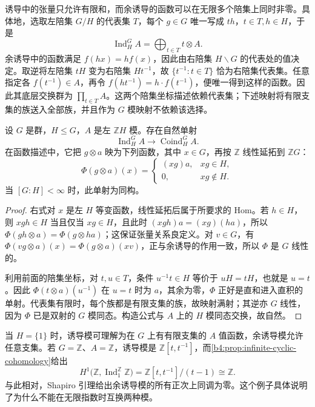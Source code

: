 诱导中的张量只允许有限和，而余诱导的函数可以在无限多个陪集上同时非零。具体地，选取左陪集 \(G/H\) 的代表集 \(T\)，每个 \(g\in G\) 唯一写成 \(th\)，\(t\in T,h\in H\)，于是
\[
	\operatorname{Ind}_H^GA=\bigoplus_{t\in T}t\otimes A.
\]
余诱导中的函数满足 \(f(hx)=hf(x)\)，因此由右陪集 \(H\backslash G\) 的代表处的值决定。取逆将左陪集 \(tH\) 变为右陪集 \(Ht^{-1}\)，故 \(\{t^{-1}:t\in T\}\) 恰为右陪集代表集。任意指定各 \(f(t^{-1})\in A\)，再令 \(f(ht^{-1})=h\cdot f(t^{-1})\)，便唯一得到这样的函数。因此其底层交换群为 \(\prod_{t\in T}A\)。这两个陪集坐标描述依赖代表集；下述映射将有限支集的族送入全部族，并且作为 \(G\) 模映射不依赖该选择。

\begin{proposition}\label{b4:prop:induction-coinduction-finite-index}
	设 \(G\) 是群，\(H\le G\)，\(A\) 是左 \(\mathbb ZH\) 模。存在自然单射
	\[
		\operatorname{Ind}_H^G A\longrightarrow\operatorname{Coind}_H^G A.
	\]
	在函数描述中，它把 \(g\otimes a\) 映为下列函数，其中 \(x\in G\)，再按 \(\mathbb Z\) 线性延拓到 \(\mathbb ZG\)：
	\[
		\Phi(g\otimes a)(x)=
		\begin{cases}
			(xg)a,&xg\in H,\\
			0,&xg\notin H.
		\end{cases}
	\]
	当 \([G:H]<\infty\) 时，此单射为同构。
\end{proposition}
\begin{proof}
	右式对 \(x\) 是左 \(H\) 等变函数，线性延拓后属于所要求的 Hom。若 \(h\in H\)，则 \(xgh\in H\) 当且仅当 \(xg\in H\)，且此时 \((xgh)a=(xg)(ha)\)，所以 \(\Phi(gh\otimes a)=\Phi(g\otimes ha)\)；这保证张量关系良定义。对 \(v\in G\)，有 \(\Phi(vg\otimes a)(x)=\Phi(g\otimes a)(xv)\)，正与余诱导的作用一致，所以 \(\Phi\) 是 \(G\) 线性的。

	利用前面的陪集坐标，对 \(t,u\in T\)，条件 \(u^{-1}t\in H\) 等价于 \(uH=tH\)，也就是 \(u=t\)。因此 \(\Phi(t\otimes a)(u^{-1})\) 在 \(u=t\) 时为 \(a\)，其余为零，\(\Phi\) 正好是直和进入直积的单射。代表集有限时，每个族都是有限支集的族，故映射满射；其逆亦 \(G\) 线性，因为 \(\Phi\) 已是双射的 \(G\) 模同态。构造公式与 \(A\) 上的 \(H\) 模同态交换，故自然。
\end{proof}

当 \(H=\{1\}\) 时，诱导模可理解为在 \(G\) 上有有限支集的 \(A\) 值函数，余诱导模允许任意支集。若 \(G=\mathbb Z\)、\(A=\mathbb Z\)，诱导模是 \(\mathbb Z[t,t^{-1}]\)，而\cref{b4:prop:infinite-cyclic-cohomology}给出
\[
	H^1\bigl(\mathbb Z,\operatorname{Ind}_{1}^{\mathbb Z}\mathbb Z\bigr) =\mathbb Z[t,t^{-1}]/(t-1)\cong\mathbb Z.
\]
与此相对，Shapiro 引理给出余诱导模的所有正次上同调为零。这个例子具体说明了为什么不能在无限指数时互换两种模。

